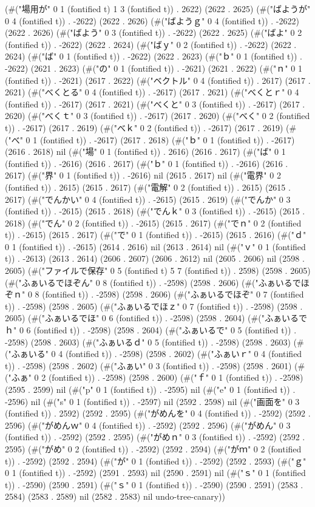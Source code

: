 (#("場用が" 0 1 (fontified t) 1 3 (fontified t)) . 2622) (2622 . 2625) (#("ばようが" 0 4 (fontified t)) . -2622) (2622 . 2626) (#("ばようｇ" 0 4 (fontified t)) . -2622) (2622 . 2626) (#("ばよう" 0 3 (fontified t)) . -2622) (2622 . 2625) (#("ばよ" 0 2 (fontified t)) . -2622) (2622 . 2624) (#("ばｙ" 0 2 (fontified t)) . -2622) (2622 . 2624) (#("ば" 0 1 (fontified t)) . -2622) (2622 . 2623) (#("ｂ" 0 1 (fontified t)) . -2622) (2621 . 2623) (#("の" 0 1 (fontified t)) . -2621) (2621 . 2622) (#("ｎ" 0 1 (fontified t)) . -2621) (2617 . 2622) (#("ベクトル" 0 4 (fontified t)) . 2617) (2617 . 2621) (#("べくとる" 0 4 (fontified t)) . -2617) (2617 . 2621) (#("べくとｒ" 0 4 (fontified t)) . -2617) (2617 . 2621) (#("べくと" 0 3 (fontified t)) . -2617) (2617 . 2620) (#("べくｔ" 0 3 (fontified t)) . -2617) (2617 . 2620) (#("べく" 0 2 (fontified t)) . -2617) (2617 . 2619) (#("べｋ" 0 2 (fontified t)) . -2617) (2617 . 2619) (#("べ" 0 1 (fontified t)) . -2617) (2617 . 2618) (#("ｂ" 0 1 (fontified t)) . -2617) (2616 . 2618) nil (#("場" 0 1 (fontified t)) . 2616) (2616 . 2617) (#("ば" 0 1 (fontified t)) . -2616) (2616 . 2617) (#("ｂ" 0 1 (fontified t)) . -2616) (2616 . 2617) (#("界" 0 1 (fontified t)) . -2616) nil (2615 . 2617) nil (#("電界" 0 2 (fontified t)) . 2615) (2615 . 2617) (#("電解" 0 2 (fontified t)) . 2615) (2615 . 2617) (#("でんかい" 0 4 (fontified t)) . -2615) (2615 . 2619) (#("でんか" 0 3 (fontified t)) . -2615) (2615 . 2618) (#("でんｋ" 0 3 (fontified t)) . -2615) (2615 . 2618) (#("でん" 0 2 (fontified t)) . -2615) (2615 . 2617) (#("でｎ" 0 2 (fontified t)) . -2615) (2615 . 2617) (#("で" 0 1 (fontified t)) . -2615) (2615 . 2616) (#("ｄ" 0 1 (fontified t)) . -2615) (2614 . 2616) nil (2613 . 2614) nil (#("ｖ" 0 1 (fontified t)) . -2613) (2613 . 2614) (2606 . 2607) (2606 . 2612) nil (2605 . 2606) nil (2598 . 2605) (#("ファイルで保存" 0 5 (fontified t) 5 7 (fontified t)) . 2598) (2598 . 2605) (#("ふぁいるでほぞん" 0 8 (fontified t)) . -2598) (2598 . 2606) (#("ふぁいるでほぞｎ" 0 8 (fontified t)) . -2598) (2598 . 2606) (#("ふぁいるでほぞ" 0 7 (fontified t)) . -2598) (2598 . 2605) (#("ふぁいるでほｚ" 0 7 (fontified t)) . -2598) (2598 . 2605) (#("ふぁいるでほ" 0 6 (fontified t)) . -2598) (2598 . 2604) (#("ふぁいるでｈ" 0 6 (fontified t)) . -2598) (2598 . 2604) (#("ふぁいるで" 0 5 (fontified t)) . -2598) (2598 . 2603) (#("ふぁいるｄ" 0 5 (fontified t)) . -2598) (2598 . 2603) (#("ふぁいる" 0 4 (fontified t)) . -2598) (2598 . 2602) (#("ふぁいｒ" 0 4 (fontified t)) . -2598) (2598 . 2602) (#("ふぁい" 0 3 (fontified t)) . -2598) (2598 . 2601) (#("ふぁ" 0 2 (fontified t)) . -2598) (2598 . 2600) (#("ｆ" 0 1 (fontified t)) . -2598) (2595 . 2599) nil (#("p" 0 1 (fontified t)) . -2595) nil (#("e" 0 1 (fontified t)) . -2596) nil (#("s" 0 1 (fontified t)) . -2597) nil (2592 . 2598) nil (#("画面を" 0 3 (fontified t)) . 2592) (2592 . 2595) (#("がめんを" 0 4 (fontified t)) . -2592) (2592 . 2596) (#("がめんｗ" 0 4 (fontified t)) . -2592) (2592 . 2596) (#("がめん" 0 3 (fontified t)) . -2592) (2592 . 2595) (#("がめｎ" 0 3 (fontified t)) . -2592) (2592 . 2595) (#("がめ" 0 2 (fontified t)) . -2592) (2592 . 2594) (#("がｍ" 0 2 (fontified t)) . -2592) (2592 . 2594) (#("が" 0 1 (fontified t)) . -2592) (2592 . 2593) (#("ｇ" 0 1 (fontified t)) . -2592) (2591 . 2593) nil (2590 . 2591) nil (#("ｓ" 0 1 (fontified t)) . -2590) (2590 . 2591) (#("ｓ" 0 1 (fontified t)) . -2590) (2590 . 2591) (2583 . 2584) (2583 . 2589) nil (2582 . 2583) nil undo-tree-canary))
